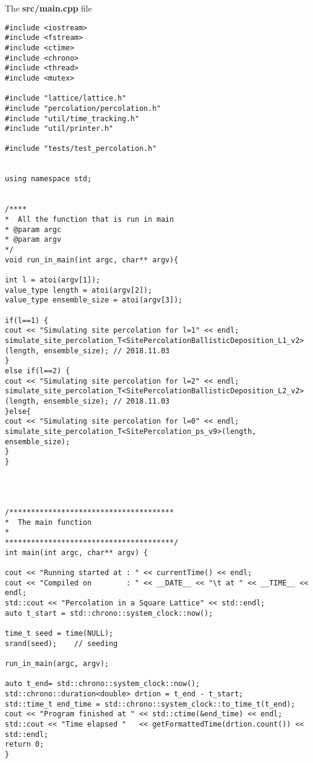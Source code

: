 
The \textbf{src/main.cpp} file

\begin{lstlisting}[style=CStyle]
#include <iostream>
#include <fstream>
#include <ctime>
#include <chrono>
#include <thread>
#include <mutex>

#include "lattice/lattice.h"
#include "percolation/percolation.h"
#include "util/time_tracking.h"
#include "util/printer.h"

#include "tests/test_percolation.h"


using namespace std;


/****
*  All the function that is run in main
* @param argc
* @param argv
*/
void run_in_main(int argc, char** argv){

int l = atoi(argv[1]);
value_type length = atoi(argv[2]);
value_type ensemble_size = atoi(argv[3]);

if(l==1) {
cout << "Simulating site percolation for l=1" << endl;
simulate_site_percolation_T<SitePercolationBallisticDeposition_L1_v2>(length, ensemble_size); // 2018.11.03
}
else if(l==2) {
cout << "Simulating site percolation for l=2" << endl;
simulate_site_percolation_T<SitePercolationBallisticDeposition_L2_v2>(length, ensemble_size); // 2018.11.03
}else{
cout << "Simulating site percolation for l=0" << endl;
simulate_site_percolation_T<SitePercolation_ps_v9>(length, ensemble_size);
}
}




/**************************************
*  The main function
*
***************************************/
int main(int argc, char** argv) {

cout << "Running started at : " << currentTime() << endl;
cout << "Compiled on        : " << __DATE__ << "\t at " << __TIME__ << endl;
std::cout << "Percolation in a Square Lattice" << std::endl;
auto t_start = std::chrono::system_clock::now();

time_t seed = time(NULL);
srand(seed);    // seeding

run_in_main(argc, argv);

auto t_end= std::chrono::system_clock::now();
std::chrono::duration<double> drtion = t_end - t_start;
std::time_t end_time = std::chrono::system_clock::to_time_t(t_end);
cout << "Program finished at " << std::ctime(&end_time) << endl;
std::cout << "Time elapsed "   << getFormattedTime(drtion.count()) << std::endl;
return 0;
}
\end{lstlisting}